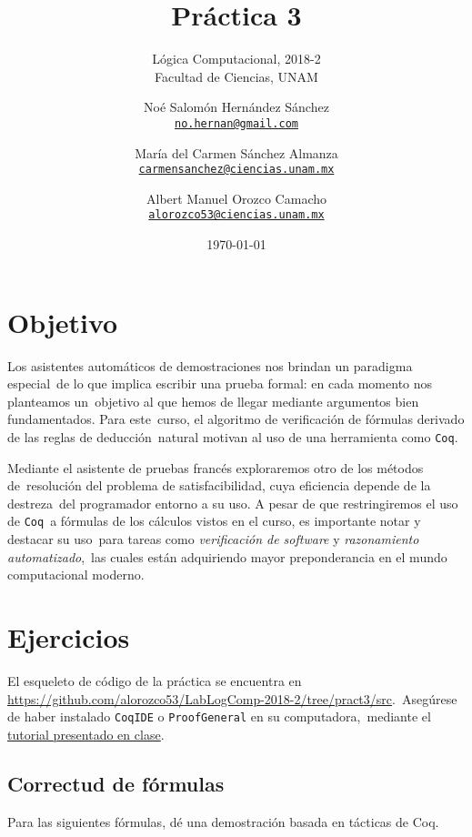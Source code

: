 \documentclass[paper=letter, fontsize=12pt]{scrartcl}
\title{Práctica 3}
\subtitle{
  Lógica Computacional, 2018-2\\
  Facultad de Ciencias, UNAM
}
\author{
  \normalsize
  Noé Salomón Hernández Sánchez\\
  \normalsize
  \texttt{\href{mailto:no.hernan@gmail.com}{no.hernan@gmail.com}}
  \and
  \normalsize
  María del Carmen Sánchez Almanza\\
  \normalsize
  \texttt{\href{mailto:carmensanchez@ciencias.unam.mx}{carmensanchez@ciencias.unam.mx}}
  \and
  \normalsize
  Albert Manuel Orozco Camacho\\
  \normalsize
  \texttt{\href{mailto:alorozco53@ciencias.unam.mx}{alorozco53@ciencias.unam.mx}}
}
\date{\today}
\begin{document}
\maketitle

\section{Objetivo}

\noindent
Los asistentes automáticos de demostraciones nos brindan un paradigma especial\
de lo que implica escribir una prueba formal: en cada momento nos planteamos un\
objetivo al que hemos de llegar mediante argumentos bien fundamentados. Para este\
curso, el algoritmo de verificación de fórmulas derivado de las reglas de deducción\
natural motivan al uso de una herramienta como \verb+Coq+.\par
Mediante el asistente de pruebas francés exploraremos otro de los métodos de\
resolución del problema de satisfacibilidad, cuya eficiencia depende de la destreza\
del programador entorno a su uso. A pesar de que restringiremos el uso de \verb+Coq+\
a fórmulas de los cálculos vistos en el curso, es importante notar y destacar su uso\
para tareas como \emph{verificación de software} y \emph{razonamiento automatizado},\
las cuales están adquiriendo mayor preponderancia en el mundo computacional moderno.

\section{Ejercicios}

\noindent
El esqueleto de código de la práctica se encuentra en \url{https://github.com/alorozco53/LabLogComp-2018-2/tree/pract3/src}.\
Asegúrese de haber instalado \verb+CoqIDE+ o \verb+ProofGeneral+ en su computadora,\
mediante el \href{https://github.com/alorozco53/LabLogComp-2018-2/blob/master/notas/session9/coq.md}{\underline{tutorial presentado en clase}}.

\subsection{Correctud de fórmulas}

\noindent
Para las siguientes fórmulas, dé una demostración basada en tácticas de Coq.
\end{document}
